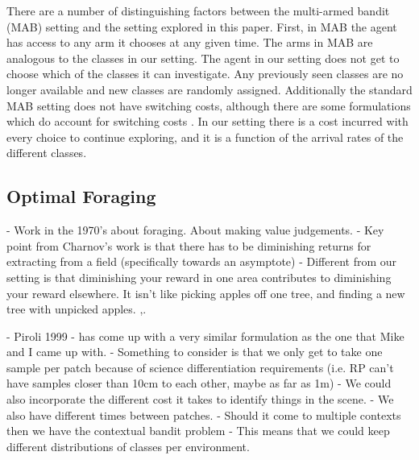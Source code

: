 
There are a number of distinguishing factors between the multi-armed bandit
(MAB) setting and the setting explored in this paper.  First, in MAB the agent
has access to any arm it chooses at any given time.  The arms in MAB are
analogous to the classes in our setting.  The agent in our setting does not get
to choose which of the classes it can investigate.  Any previously seen classes
are no longer available and new classes are randomly assigned.  Additionally
the standard MAB setting does not have switching costs, although there are some
formulations which do account for switching costs
\cite{switchingBanditPapersFindOne}.  In our setting there is a cost incurred
with every choice to continue exploring, and it is a function of the arrival
rates of the different classes.

\subsection{Optimal Foraging}

	- Work in the 1970's about foraging.  About making value judgements.
		- Key point from Charnov's work is that there has to be diminishing returns
		for extracting from a field (specifically towards an asymptote)
		- Different from our setting is that diminishing your reward in one area 
		contributes to diminishing your reward elsewhere. It isn't like picking
		apples off one tree, and finding a new tree with unpicked apples.
		\cite{charnov1973optimal},\cite{charnov1976optimal}.


	- Piroli 1999 - has come up with a very similar formulation as the one that 
		Mike and I came up with.
		- Something to consider is that we only get to take one sample per patch 
			because of science differentiation requirements (i.e. RP can't have 
			samples closer than 10cm to each other, maybe as far as 1m)
		- We could also incorporate the different cost it takes to identify things 
			in the scene.
		- We also have different times between patches.
		- Should it come to multiple contexts then we have the contextual bandit 
			problem
				- This means that we could keep different distributions of classes per 
					environment.

